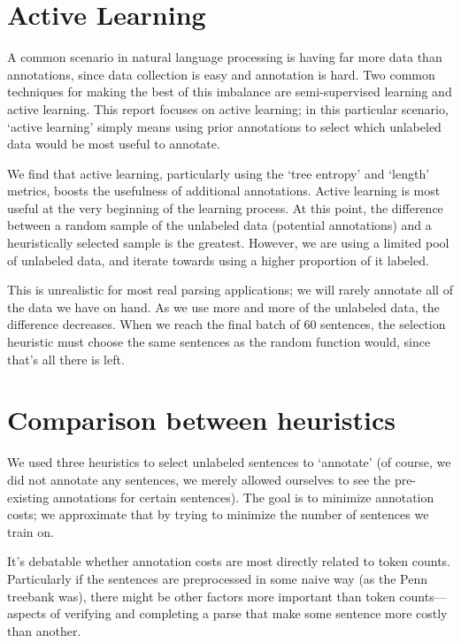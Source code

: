 \documentclass[10pt]{article}\usepackage{graphicx, color}
\begin{document}
\section{Active Learning}

A common scenario in natural language processing is having far more data than annotations, since data collection is easy and annotation is hard.
Two common techniques for making the best of this imbalance are semi-supervised learning and active learning. This report focuses on active learning; in this particular scenario, `active learning' simply means using prior annotations to select which unlabeled data would be most useful to annotate.

We find that active learning, particularly using the `tree entropy' and `length' metrics, boosts the usefulness of additional annotations.
Active learning is most useful at the very beginning of the learning process. At this point, the difference between a random sample of the unlabeled data (potential annotations) and a heuristically selected sample is the greatest. However, we are using a limited pool of unlabeled data, and iterate towards using a higher proportion of it labeled.

This is unrealistic for most real parsing applications; we will rarely annotate all of the data we have on hand.
As we use more and more of the unlabeled data, the difference decreases. When we reach the final batch of $60$ sentences, the selection heuristic must choose the same sentences as the random function would, since that's all there is left.


\section{Comparison between heuristics}

We used three heuristics to select unlabeled sentences to `annotate' (of course, we did not annotate any sentences, we merely allowed ourselves to see the pre-existing annotations for certain sentences). The goal is to minimize annotation costs; we approximate that by trying to minimize the number of sentences we train on.

It's debatable whether annotation costs are most directly related to token counts. Particularly if the sentences are preprocessed in some naive way (as the Penn treebank was), there might be other factors more important than token counts---aspects of verifying and completing a parse that make some sentence more costly than another.
\end{document}
